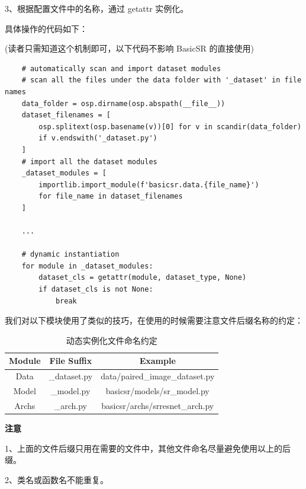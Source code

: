 \documentclass[../main.tex]{subfiles}
\begin{document}
    3、根据配置文件中的名称，通过 getattr 实例化。
    
    具体操作的代码如下： 
    
    (读者只需知道这个机制即可，以下代码不影响 BasicSR 的直接使用)
	\begin{verbatim}
    # automatically scan and import dataset modules
    # scan all the files under the data folder with '_dataset' in file names
    data_folder = osp.dirname(osp.abspath(__file__))
    dataset_filenames = [
        osp.splitext(osp.basename(v))[0] for v in scandir(data_folder)
        if v.endswith('_dataset.py')
    ]
    # import all the dataset modules
    _dataset_modules = [
        importlib.import_module(f'basicsr.data.{file_name}')
        for file_name in dataset_filenames
    ]
    
    ...
    
    # dynamic instantiation
    for module in _dataset_modules:
        dataset_cls = getattr(module, dataset_type, None)
        if dataset_cls is not None:
            break
	\end{verbatim}
	
	我们对以下模块使用了类似的技巧，在使用的时候需要注意文件后缀名称的约定：
	\begin{table}[h]
	\centering
    \begin{tabular}{|c|c|c|}
    \hline
    \textbf{Module} & \textbf{File Suffix} & \textbf{Example} \\ \hline
    Data & \_dataset.py & data/paired\_image\_dataset.py \\ \hline
    Model & \_model.py & basicsr/models/sr\_model.py \\ \hline
    Archs & \_arch.py & basicsr/archs/srresnet\_arch.py \\ \hline
    \end{tabular}
    \caption{动态实例化文件命名约定}
    \end{table}
    
    \begin{hl} %
	\textbf{注意}
	
	1、上面的文件后缀只用在需要的文件中，其他文件命名尽量避免使用以上的后缀。
	
	2、类名或函数名不能重复。
    \end{hl}
    
\end{document}
